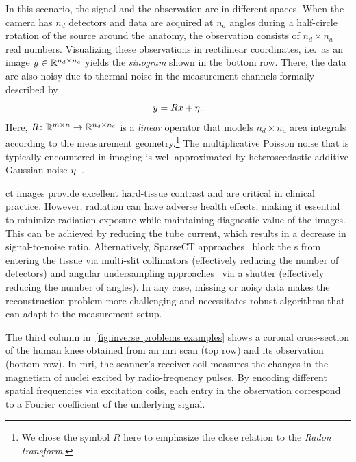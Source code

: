 In this scenario, the signal and the observation are in different spaces.
When the \xray{} camera has \( n_d \) detectors and data are acquired at \( n_a \) angles during a half-circle rotation of the source around the anatomy, the observation consists of \( n_d \times n_a \) real numbers.
Visualizing these observations in rectilinear coordinates, i.e.\ as an image \( y \in \mathbb{R}^{n_d \times n_a} \) yields the \emph{sinogram} shown in the bottom row.
There, the data are also noisy due to thermal noise in the measurement channels formally described by
\begin{equation}
	y = Rx + \eta.
\end{equation}
Here, \( R \colon \mathbb{R}^{m \times n} \to \mathbb{R}^{n_d \times n_a} \) is a \emph{linear} operator that models \( n_d \times n_a \) area integrals according to the measurement geometry.\footnote{%
	We chose the symbol \( R \) here to emphasize the close relation to the \emph{Radon transform}.%
}
The multiplicative Poisson noise that is typically encountered in \xray{} imaging is well approximated by heteroscedastic additive Gaussian noise \( \eta \)~\cite{thibault_statistical_2007}.

\xray{} \gls{ct} images provide excellent hard-tissue contrast and are critical in clinical practice.
However, \xray{} radiation can have adverse health effects, making it essential to minimize radiation exposure while maintaining diagnostic value of the images.
This can be achieved by reducing the \xray{} tube current, which results in a decrease in signal-to-noise ratio.
Alternatively, SparseCT approaches~\cite{chen_sparsect_2019,Koesters2017} block the \xray{}s from entering the tissue via multi-slit collimators (effectively reducing the number of detectors) and angular undersampling approaches~\cite{Chen2008} via a shutter (effectively reducing the number of angles).
In any case, missing or noisy data makes the reconstruction problem more challenging and necessitates robust algorithms that can adapt to the measurement setup.

The third column in~\cref{fig:inverse problems examples} shows a coronal cross-section of the human knee obtained from an \gls{mri} scan (top row) and its observation (bottom row).
In \gls{mri}, the scanner's receiver coil measures the changes in the magnetism of nuclei excited by radio-frequency pulses.
By encoding different spatial frequencies via excitation coils, each entry in the observation correspond to a Fourier coefficient of the underlying signal.

